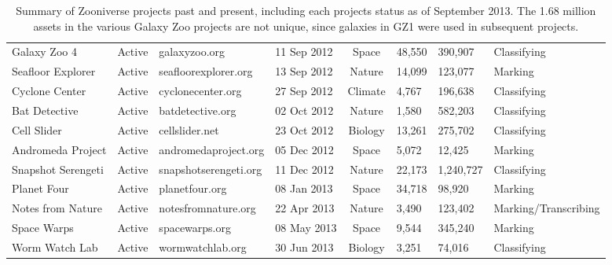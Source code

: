 \documentclass{sigchi}
\begin{document}
\begin{table}
\begin{center}
\begin{tabular}{lcllclll}
Galaxy Zoo 4 & Active & galaxyzoo.org & 11 Sep 2012 & Space & 48,550 & 390,907 & Classifying \\
Seafloor Explorer & Active & seafloorexplorer.org & 13 Sep 2012 & Nature & 14,099 & 123,077 & Marking \\
Cyclone Center & Active & cyclonecenter.org & 27 Sep 2012 & Climate & 4,767 & 196,638 & Classifying \\
Bat Detective & Active & batdetective.org & 02 Oct 2012 & Nature & 1,580 & 582,203 & Classifying \\
Cell Slider & Active & cellslider.net & 23 Oct 2012 & Biology & 13,261 & 275,702 & Classifying \\
Andromeda Project & Active & andromedaproject.org & 05 Dec 2012 & Space & 5,072 & 12,425 & Marking \\
Snapshot Serengeti & Active & snapshotserengeti.org & 11 Dec 2012 & Nature & 22,173 & 1,240,727 & Classifying \\
\hline
Planet Four & Active & planetfour.org & 08 Jan 2013 & Space & 34,718 & 98,920 & Marking \\
Notes from Nature & Active & notesfromnature.org & 22 Apr 2013 & Nature & 3,490 & 123,402 & Marking/Transcribing \\
Space Warps & Active & spacewarps.org & 08 May 2013 & Space & 9,544 & 345,240 & Marking \\
Worm Watch Lab & Active & wormwatchlab.org & 30 Jun 2013 & Biology & 3,251 & 74,016 & Classifying \\
\hline
\end{tabular}
\normalsize
\label{table:project-summary}
\caption{Summary of Zooniverse projects past and present, including each projects status as of September 2013.  The 1.68 million assets in the various Galaxy Zoo projects are not unique, since galaxies in GZ1 were used in subsequent projects.}
\end{center}
\end{table}
\end{document}
